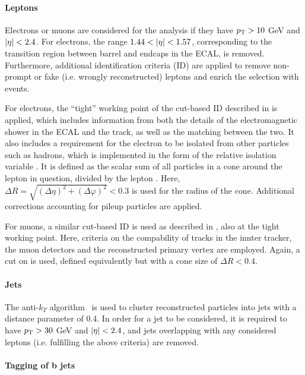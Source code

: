 \paragraph{Leptons}

Electrons or muons are considered for the analysis if they have $p_{\mathrm{T}} > 10$ GeV and $|\eta| < 2.4$. For electrons, the range $1.44 < |\eta| < 1.57$, corresponding to the transition region between barrel and endcaps in the ECAL, is removed. Furthermore, additional identification criteria (ID) are applied to remove non-prompt or fake (i.e. wrongly reconstructed) leptons and enrich the selection with \ttbar events.

For electrons, the ``tight'' working point of the cut-based ID described in  is applied, which includes information from both the details of the electromagnetic shower in the ECAL and the track, as well as the matching between the two. It also includes a requirement for the electron to be isolated from other particles such as hadrons, which is implemented in the form of the relative isolation variable \Irel. It is defined as the scalar \pt sum of all particles in a cone around the lepton in question, divided by the lepton \pt. Here, $\Delta R = \sqrt{(\Delta \eta)^2 + (\Delta \varphi)^2} < 0.3$ is used for the radius of the cone. Additional corrections accounting for pileup particles are applied.

For muons, a similar cut-based ID is used as described in , also at the tight working point. Here, criteria on the compability of tracks in the innter tracker, the muon detectors and the reconstructed primary vertex are employed. Again, a cut on \Irel is used, defined equivalently but with a cone size of $\Delta R < 0.4$.

\paragraph{Jets}

The anti-$k_T$ algorithm~\cite{Cacciari:2008gp} is used to cluster reconstructed particles into jets with a distance parameter of 0.4. In order for a jet to be considered, it is required to have $p_{\mathrm{T}} > 30$ GeV and $|\eta| < 2.4$, and jets overlapping with any considered leptons (i.e. fulfilling the above criteria) are removed. %

\paragraph{Tagging of b jets}

